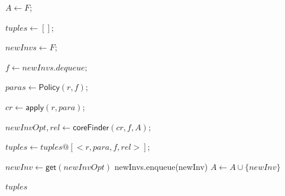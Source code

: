 \documentclass[final]{IEEEtran}
\newcommand\lyj[1]{\textcolor{magenta}{lyj: #1}}
\begin{document}
{\begin{algorithm}

{
    $A\leftarrow F$;

    $tuples \leftarrow []$;

    $newInvs \leftarrow F$;

    {
   $ f \leftarrow newInvs.dequeue$;

   { $paras \leftarrow \mathsf{Policy}(r,f)$;

     {$cr \leftarrow \mathsf{apply}(r,para)$;

       $newInvOpt,rel \leftarrow \mathsf{coreFinder}(cr,  f, A)$;

        $tuples \leftarrow tuples @[<r, para, f, rel>]$;

        {$newInv \leftarrow \mathsf{get}(newInvOpt)$\;
         newInvs.enqueue(newInv)\;
        $A \leftarrow A \cup \{newInv\}$\;
        }

     }
   }
  }
\Return $tuples$\;
}


\end{algorithm}






}
\end{document}
